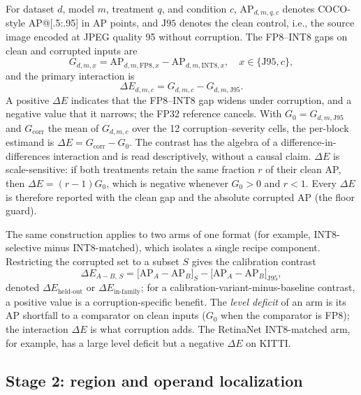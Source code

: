 \documentclass[a4paper,fleqn]{cas-dc}
\newcommand{\AP}{\mathrm{AP}}
\newcommand{\Jclean}{\mathrm{J95}}
\begin{document}
For dataset $d$, model $m$, treatment $q$, and condition $c$, $\AP_{d,m,q,c}$ denotes COCO-style AP@[.5:.95] in AP points, and $\Jclean$ denotes the clean control, i.e., the source image encoded at JPEG quality 95 without corruption. The FP8--INT8 gaps on clean and corrupted inputs are
\begin{equation}
G_{d,m,x}=\AP_{d,m,\mathrm{FP8},x}-\AP_{d,m,\mathrm{INT8},x},
\quad x\in\{\Jclean,c\},
\end{equation}
and the primary interaction is
\begin{equation}
\Delta E_{d,m,c}=G_{d,m,c}-G_{d,m,\Jclean}.
\label{eq:delta-e}
\end{equation}
A positive $\Delta E$ indicates that the FP8--INT8 gap widens under corruption, and a negative value that it narrows; the FP32 reference cancels. With $G_0=G_{d,m,\Jclean}$ and $G_{\mathrm{corr}}$ the mean of $G_{d,m,c}$ over the 12 corruption--severity cells, the per-block estimand is $\Delta E=G_{\mathrm{corr}}-G_0$. The contrast has the algebra of a difference-in-differences interaction and is read descriptively, without a causal claim. $\Delta E$ is scale-sensitive: if both treatments retain the same fraction $r$ of their clean AP, then $\Delta E=(r-1)G_0$, which is negative whenever $G_0>0$ and $r<1$. Every $\Delta E$ is therefore reported with the clean gap and the absolute corrupted AP (the floor guard).

The same construction applies to two arms of one format (for example, INT8-selective minus INT8-matched), which isolates a single recipe component. Restricting the corrupted set to a subset $S$ gives the calibration contrast
\begin{equation}
\Delta E_{A-B,\,S}=\big[\AP_A-\AP_B\big]_{S}-\big[\AP_A-\AP_B\big]_{\Jclean},
\label{eq:delta-cal}
\end{equation}
denoted $\Delta E_{\text{held-out}}$ or $\Delta E_{\text{in-family}}$; for a calibration-variant-minus-baseline contrast, a positive value is a corruption-specific benefit. The \emph{level deficit} of an arm is its AP shortfall to a comparator on clean inputs ($G_0$ when the comparator is FP8); the interaction $\Delta E$ is what corruption adds. The RetinaNet INT8-matched arm, for example, has a large level deficit but a negative $\Delta E$ on KITTI.

\subsection{Stage 2: region and operand localization}
\label{sec:localization}
\end{document}
